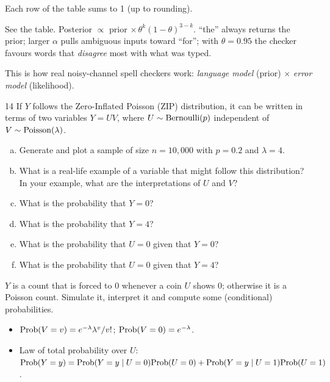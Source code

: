\documentclass[11pt]{article}
\begin{document}
\begin{sanity}
Each row of the table sums to 1 (up to rounding). \checkmark
\end{sanity}

\begin{answer}
See the table. Posterior $\propto$ prior $\times\,\theta^k(1-\theta)^{3-k}$. ``the'' always returns the prior; larger $\alpha$ pulls ambiguous inputs toward ``for''; with $\theta=0.95$ the checker favours words that \emph{disagree} most with what was typed.
\end{answer}

\begin{takeaway}
This is how real noisy-channel spell checkers work: \emph{language model} (prior) $\times$ \emph{error model} (likelihood).
\end{takeaway}


\begin{problem}{14}
If $Y$ follows the Zero-Inflated Poisson (ZIP) distribution, it can be written in terms of two variables $Y=UV$, where $U\sim\mathrm{Bernoulli}(p)$ independent of $V\sim\mathrm{Poisson}(\lambda)$.
\begin{enumerate}[(a)]
\item Generate and plot a sample of size $n=10{,}000$ with $p=0.2$ and $\lambda=4$.
\item What is a real-life example of a variable that might follow this distribution? In your example, what are the interpretations of $U$ and $V$?
\item What is the probability that $Y=0$?
\item What is the probability that $Y=4$?
\item What is the probability that $U=0$ given that $Y=0$?
\item What is the probability that $U=0$ given that $Y=4$?
\end{enumerate}
\end{problem}

\begin{restate}
$Y$ is a count that is forced to 0 whenever a coin $U$ shows 0; otherwise it is a Poisson count. Simulate it, interpret it and compute some (conditional) probabilities.
\end{restate}

\begin{recall}
\begin{itemize}
\item $\mathrm{Prob}(V=v)=e^{-\lambda}\lambda^v/v!$; \quad $\mathrm{Prob}(V=0)=e^{-\lambda}$.
\item Law of total probability over $U$: $\mathrm{Prob}(Y=y)=\mathrm{Prob}(Y=y\mid U=0)\mathrm{Prob}(U=0)+\mathrm{Prob}(Y=y\mid U=1)\mathrm{Prob}(U=1)$.
\end{itemize}
\end{recall}
\end{document}
